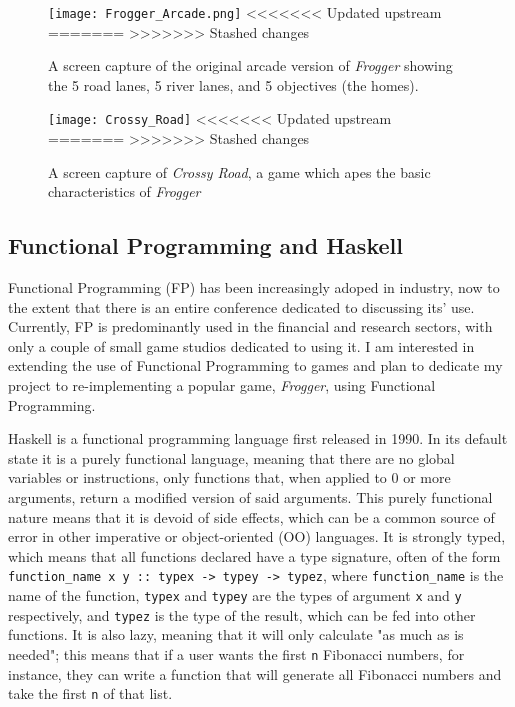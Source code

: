 \documentclass[12pt, a4paper]{report}
\begin{document}
\begin{figure}[ht]
  \centering
  \caption{A screen capture of the original arcade version of \textit{Frogger} showing the 5 road lanes, 5 river lanes, and 5 objectives (the homes).}
  \texttt{[image: Frogger\_Arcade.png]}
<<<<<<< Updated upstream
=======
  \label{fig:froggerarcade}
>>>>>>> Stashed changes
\end{figure}
\begin{figure}[ht]
  \centering
  \caption{A screen capture of \textit{Crossy Road}, a game which apes the basic characteristics of \textit{Frogger}}
  \texttt{[image: Crossy\_Road]}
<<<<<<< Updated upstream
=======
  \label{fig:crossyroad}
>>>>>>> Stashed changes
\end{figure}

\subsection{Functional Programming and Haskell}
Functional Programming (FP) has been increasingly adoped in industry, now to the extent that there is an entire conference dedicated to discussing its' use\cite{cufp}.
Currently, FP is predominantly used in the financial and research sectors, with only a couple of small game studios dedicated to using it.
I am interested in extending the use of Functional Programming to games and plan to dedicate my project to re-implementing a popular game, \textit{Frogger}, using Functional Programming.
\par
Haskell is a functional programming language first released in 1990.
In its default state it is a purely functional language, meaning that there are no global variables or instructions, only functions that, when applied to 0 or more arguments, return a modified version of said arguments.
This purely functional nature means that it is devoid of side effects, which can be a common source of error in other imperative or object-oriented (OO) languages.
It is strongly typed\cite{haskellsite}, which means that all functions declared have a type signature, often of the form \verb|function_name x y :: typex -> typey -> typez|, where \verb|function_name| is the name of the function, \verb|typex| and \verb|typey| are the types of argument \verb|x| and \verb|y| respectively, and \verb|typez| is the type of the result, which can be fed into other functions.
It is also lazy\cite{haskellsite}, meaning that it will only calculate "as much as is needed"; this means that if a user wants the first \verb|n| Fibonacci numbers, for instance, they can write a function that will generate all Fibonacci numbers and take the first \verb|n| of that list.
\end{document}
